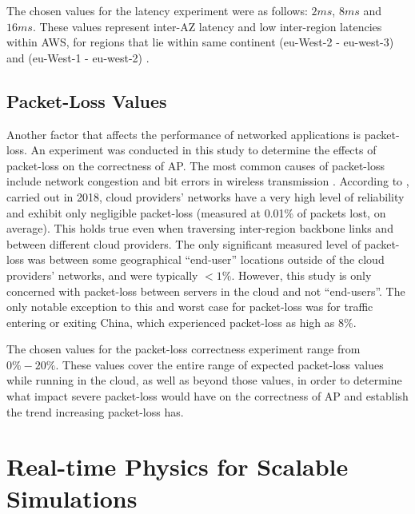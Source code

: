 The chosen values for the latency experiment were as follows: $2ms$, $8ms$ and $16ms$. These values represent inter-AZ latency and low inter-region latencies within AWS, for regions that lie within same continent (eu-West-2 - eu-west-3) and (eu-West-1 - eu-west-2) \cite{ThousandEyesCloudPerf2019}.

\subsection{Packet-Loss Values}
Another factor that affects the performance of networked applications is packet-loss. An experiment was conducted in this study to determine the effects of packet-loss on the correctness of AP. The most common causes of packet-loss include network congestion \cite{1998PacketLoss} and bit errors in wireless transmission \cite{2005PacketLoss}. According to \cite{ThousandEyesCloudPerf2018}, carried out in 2018, cloud providers' networks have a very high level of reliability and exhibit only negligible packet-loss (measured at 0.01\% of packets lost, on average). This holds true even when traversing inter-region backbone links and between different cloud providers. The only significant measured level of packet-loss was between some geographical ``end-user'' locations outside of the cloud providers' networks, and were typically $<1\%$. However, this study is only concerned with packet-loss between servers in the cloud and not ``end-users''. The only notable exception to this and worst case for packet-loss was for traffic entering or exiting China, which experienced packet-loss as high as $8\%$.

The chosen values for the packet-loss correctness experiment range from $0\%-20\%$. These values cover the entire range of expected packet-loss values while running in the cloud, as well as beyond those values, in order to determine what impact severe packet-loss would have on the correctness of AP and establish the trend increasing packet-loss has.

\section{Real-time Physics for Scalable Simulations}

